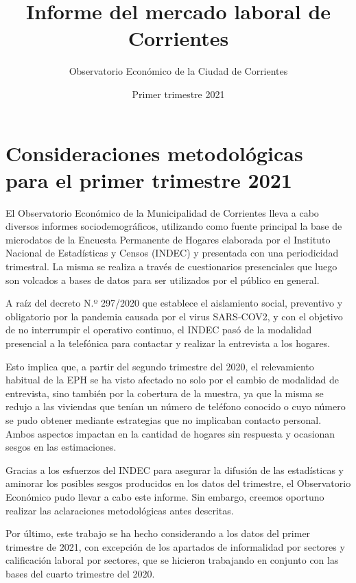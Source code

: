 \documentclass[
]{article}
\title{Informe del mercado laboral de Corrientes}
\author{Observatorio Económico de la Ciudad de Corrientes}
\date{Primer trimestre 2021}
\begin{document}
\maketitle

\hypertarget{consideraciones-metodoluxf3gicas-para-el-primer-trimestre-2021}{%
\section{Consideraciones metodológicas para el primer trimestre
2021}\label{consideraciones-metodoluxf3gicas-para-el-primer-trimestre-2021}}

El Observatorio Económico de la Municipalidad de Corrientes lleva a cabo
diversos informes sociodemográficos, utilizando como fuente principal la
base de microdatos de la Encuesta Permanente de Hogares elaborada por el
Instituto Nacional de Estadísticas y Censos (INDEC) y presentada con una
periodicidad trimestral. La misma se realiza a través de cuestionarios
presenciales que luego son volcados a bases de datos para ser utilizados
por el público en general.

A raíz del decreto N.º 297/2020 que establece el aislamiento social,
preventivo y obligatorio por la pandemia causada por el virus SARS-COV2,
y con el objetivo de no interrumpir el operativo continuo, el INDEC pasó
de la modalidad presencial a la telefónica para contactar y realizar la
entrevista a los hogares.

Esto implica que, a partir del segundo trimestre del 2020, el
relevamiento habitual de la EPH se ha visto afectado no solo por el
cambio de modalidad de entrevista, sino también por la cobertura de la
muestra, ya que la misma se redujo a las viviendas que tenían un número
de teléfono conocido o cuyo número se pudo obtener mediante estrategias
que no implicaban contacto personal. Ambos aspectos impactan en la
cantidad de hogares sin respuesta y ocasionan sesgos en las
estimaciones.

Gracias a los esfuerzos del INDEC para asegurar la difusión de las
estadísticas y aminorar los posibles sesgos producidos en los datos del
trimestre, el Observatorio Económico pudo llevar a cabo este informe.
Sin embargo, creemos oportuno realizar las aclaraciones metodológicas
antes descritas.

Por último, este trabajo se ha hecho considerando a los datos del primer
trimestre de 2021, con excepción de los apartados de informalidad por
sectores y calificación laboral por sectores, que se hicieron trabajando
en conjunto con las bases del cuarto trimestre del 2020.
\end{document}
